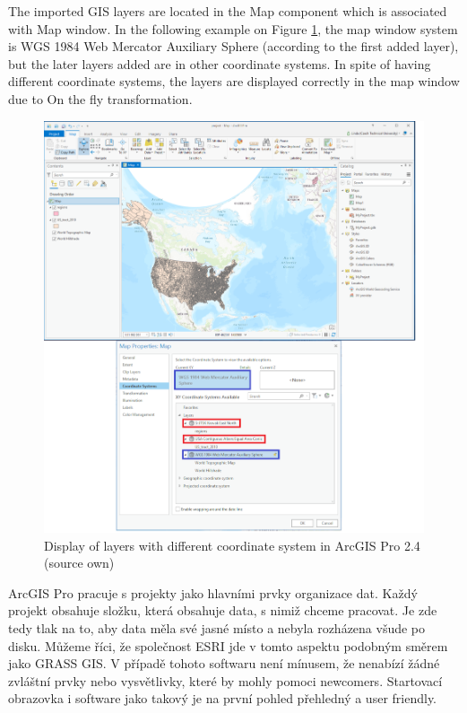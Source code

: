 \documentclass[a4paper,10pt,twoside]{article}
\begin{document}
\noindent The imported GIS layers are located in the Map component which is associated with Map window. In the following example on Figure \ref{fig:arcgis_pro_onthefly2}, the map window system is WGS 1984 Web Mercator Auxiliary Sphere (according to the first added layer), but the later layers added are in other coordinate systems. In spite of having different coordinate systems, the layers are displayed correctly in the map window due to On the fly transformation.

\vspace{0.3cm}
\begin{figure}[hbt!] 
\begin{center}
\includegraphics[width=15cm]{../pictures/arcgis_pro_onthefly2.png} 
\caption[Display of layers with different coordinate system in ArcGIS Pro 2.4 (source own)]{Display of layers with different coordinate system in ArcGIS Pro 2.4 (source own)}
\label{fig:arcgis_pro_onthefly2}
\end{center}
\end{figure}

\noindent ArcGIS Pro pracuje s projekty jako hlavními prvky organizace dat. Každý projekt obsahuje složku, která obsahuje data, s nimiž chceme pracovat. Je zde tedy tlak na to, aby data měla své jasné místo a nebyla rozházena všude po disku. Můžeme říci, že společnost ESRI jde v tomto aspektu podobným směrem jako GRASS GIS. V případě tohoto softwaru není mínusem, že nenabízí žádné zvláštní prvky nebo vysvětlivky, které by mohly pomoci newcomers. Startovací obrazovka i software jako takový je na první pohled přehledný a user friendly.
\end{document}
